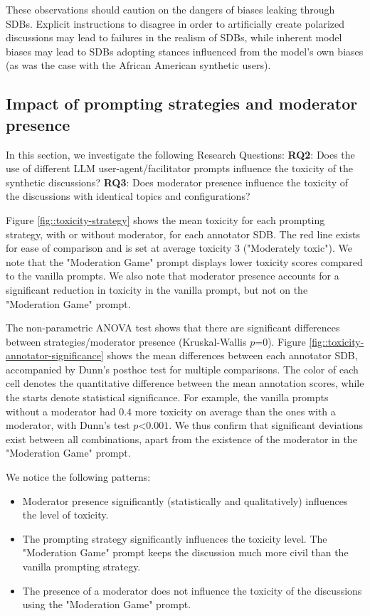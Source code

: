 These observations should caution on the dangers of biases leaking through \acp{SDB}. Explicit instructions to disagree in order to artificially create polarized discussions may lead to failures in the realism of \acp{SDB}, while inherent model biases may lead to \acp{SDB} adopting stances influenced from the model's own biases (as was the case with the African American synthetic users).


\subsection{Impact of prompting strategies and moderator presence}
\label{ssec:evaluation:prompts}

In this section, we investigate the following Research Questions: \textbf{RQ2}: Does the use of different LLM user-agent/facilitator prompts influence the toxicity of the synthetic discussions? \textbf{RQ3}: Does moderator presence influence the toxicity of the discussions with identical topics and configurations?

Figure \ref{fig::toxicity-strategy} shows the mean toxicity for each prompting strategy, with or without moderator, for each annotator \ac{SDB}. The red line exists for ease of comparison and is set at average toxicity 3 ("Moderately toxic"). We note that the "Moderation Game" prompt displays lower toxicity scores compared to the vanilla prompts. We also note that moderator presence accounts for a significant reduction in toxicity in the vanilla prompt, but not on the "Moderation Game" prompt. 

The non-parametric ANOVA test shows that there are significant differences between strategies/moderator presence (Kruskal-Wallis $p\text{=}0$). Figure \ref{fig::toxicity-annotator-significance} shows the mean differences between each annotator \ac{SDB}, accompanied by Dunn's posthoc test for multiple comparisons. The color of each cell denotes the quantitative difference between the mean annotation scores, while the starts denote statistical significance. For example, the vanilla prompts without a moderator had $0.4$ more toxicity on average than the ones with a moderator, with Dunn's test $p\text{<}0.001$. We thus confirm that significant deviations exist between all combinations, apart from the existence of the moderator in the "Moderation Game" prompt.

We notice the following patterns:

\begin{itemize}
	\item Moderator presence significantly (statistically and qualitatively) influences the level of toxicity.
	
	\item The prompting strategy significantly influences the toxicity level. The "Moderation Game" prompt keeps the discussion much more civil than the vanilla prompting strategy.
	
	\item The presence of a moderator does not influence the toxicity of the discussions using the "Moderation Game" prompt.
\end{itemize}

